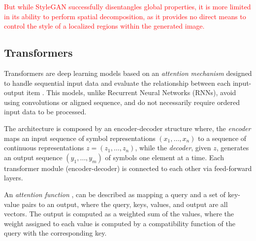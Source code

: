 \documentclass{article}
\begin{document}
	\textcolor{red}{
	But while StyleGAN successfully disentangles global properties, it is more limited in its ability to 
	perform spatial decomposition, as it provides no direct means to control the style of a localized 
	regions within the generated image.}

	\subsection{Transformers}%
	Transformers are deep learning models based on an \textit{attention mechanism} designed to handle 
	sequential input data and evaluate the relationship between each input-output item 
	\cite{vaswani2017attention}.
	This models, unlike Recurrent Neural Networks (RNNs), avoid using convolutions or aligned 
	sequence, and do not necessarily require ordered input data to be processed. 
	
	The architecture is composed by an encoder-decoder structure where, the \textit{encoder} maps an 
	input sequence of symbol representations $(x_1,\dots, x_n)$ to a sequence of continuous 
	representations $z = (z_1, \dots, z_n)$, while the  \textit{decoder}, given $z$, generates an 
	output sequence $(y_1, \dots, y_m)$ of symbols one element at a time. 
	Each transformer module (encoder-decoder) is connected to each other via feed-forward layers.
	
	
	An \textit{attention function} \cite{vaswani2017attention}, can be described as mapping a query and 
	a set of key-value pairs to an output, where the query, keys, values, and output are all vectors. The 
	output is computed as a weighted sum of the values, where the weight assigned to each value is 
	computed by a compatibility function of the query with the corresponding key.
\end{document}

